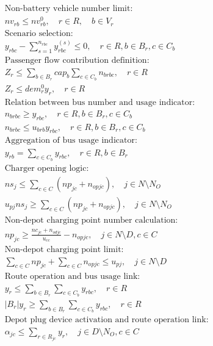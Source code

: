 \documentclass[11pt]{ctexart}
\begin{document}
\begin{align*}
&\text{Non-battery vehicle number limit:} \\
& nv_{rb} \leq nv^0_{rb}, \quad r \in R, \quad b \in V_r \tag{13} \\
&\text{Scenario selection:} \\
& y_{rbc} - \sum_{s=1}^{n_{rbc}} y^{(s)}_{rbc} \leq 0, \quad r \in R, b \in B_r, c \in C_b \tag{14} \\
&\text{Passenger flow contribution definition:} \\
& Z_r \leq \sum_{b \in B_r} cap_b \sum_{c \in C_b} n_{brbc}, \quad r \in R \tag{15} \\
& Z_r \leq dem^0_r y_r, \quad r \in R \tag{16} \\
&\text{Relation between bus number and usage indicator:} \\
& n_{brbc} \geq y_{rbc}, \quad r \in R, b \in B_r, c \in C_b \tag{17} \\
& n_{brbc} \leq u_{brb} y_{rbc}, \quad r \in R, b \in B_r, c \in C_b \tag{18} \\
&\text{Aggregation of bus usage indicator:} \\
& y_{rb} = \sum_{c \in C_b} y_{rbc}, \quad r \in R, b \in B_r \tag{19} \\
&\text{Charger opening logic:} \\
& ns_j \leq \sum_{c \in C} (np_{jc} + n_{opjc}), \quad j \in N \setminus N_O \tag{20} \\
& u_{pj} ns_j \geq \sum_{c \in C} (np_{jc} + n_{opjc}), \quad j \in N \setminus N_O \tag{21} \\
&\text{Non-depot charging point number calculation:} \\
& np_{jc} \geq \frac{nc_{jc} + n_{odjc}}{u_{cc}} - n_{opjc}, \quad j \in N \setminus D, c \in C \tag{22} \\
&\text{Non-depot charging point limit:} \\
& \sum_{c \in C} np_{jc} + \sum_{c \in C} n_{opjc} \leq u_{pj}, \quad j \in N \setminus D \tag{23} \\
&\text{Route operation and bus usage link:} \\
& y_r \leq \sum_{b \in B_r} \sum_{c \in C_b} y_{rbc}, \quad r \in R \tag{24} \\
& |B_r| y_r \geq \sum_{b \in B_r} \sum_{c \in C_b} y_{rbc}, \quad r \in R \tag{25} \\
&\text{Depot plug device activation and route operation link:} \\
& \alpha_{jc} \leq \sum_{r \in R_{jc}} y_r, \quad j \in D \setminus N_O, c \in C \tag{26} \\

\end{align*}
\end{document}
